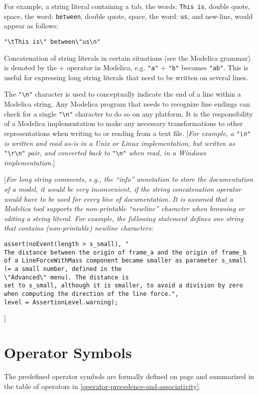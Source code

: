 For example, a string literal containing a tab, the words: \lstinline[basicstyle=\ttfamily]!This is!,
double quote, space, the word: \lstinline[basicstyle=\ttfamily]!between!, double quote, space, the word:
\lstinline[basicstyle=\ttfamily]!us!, and new-line, would appear as follows:

\lstinline[basicstyle=\ttfamily]!"\tThis is\" between\"us\n"!

Concatenation of string literals in certain situations (see the Modelica
grammar) is denoted by the + operator in Modelica, e.g. \lstinline[basicstyle=\ttfamily]!"a"! + \lstinline[basicstyle=\ttfamily]!"b"!
becomes \lstinline[basicstyle=\ttfamily]!"ab"!. This is useful for expressing long string literals that
need to be written on several lines.

The \lstinline[basicstyle=\ttfamily]!"\n"! character is used to conceptually indicate the
end of a line within a Modelica string. Any Modelica program that needs
to recognize line endings can check for a single 
\lstinline[basicstyle=\ttfamily]!"\n"!
character to do so on any platform. It is the responsibility of a
Modelica implementation to make any necessary transformations to other
representations when writing to or reading from a text file.
{[}\emph{For example, a \lstinline[basicstyle=\ttfamily]!"\n"! is written and read as-is in
a Unix or Linux implementation, but written as}
\lstinline[basicstyle=\ttfamily]!"\r\n"! \emph{pair, and converted back to}
\lstinline[basicstyle=\ttfamily]!"\n"! \emph{when read, in a Windows implementation.}{]}

{[}\emph{For long string comments, e.g., the ``info'' annotation to
store the documentation of a model, it would be very inconvenient, if
the string concatenation operator would have to be used for every line
of documentation. It is assumed that a Modelica tool supports the
non-printable ``newline'' character when browsing or editing a string
literal. For example, the following statement defines one string that
contains (non-printable) newline characters:}

\begin{lstlisting}[language=modelica]
assert(noEvent(length > s_small), "
The distance between the origin of frame_a and the origin of frame_b
of a LineForceWithMass component became smaller as parameter s_small
(= a small number, defined in the
\"Advanced\" menu). The distance is
set to s_small, although it is smaller, to avoid a division by zero
when computing the direction of the line force.",
level = AssertionLevel.warning);
\end{lstlisting}
]
\section{Operator Symbols}

The predefined operator symbols are formally defined on page \pageref{lexical-conventions} and
summarized in the table of operators in \autoref{operator-precedence-and-associativity}.
